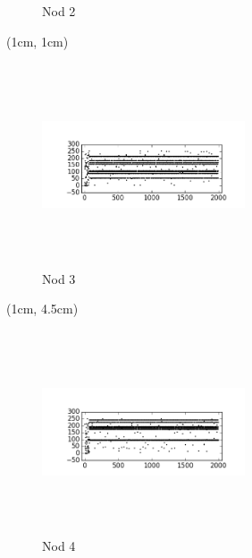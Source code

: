 \documentclass{beamer}
\theoremstyle{definition}
\begin{document}
\begin{frame}
{\begin{textblock*}{4cm}
\begin{figure}
            \caption{Nod 2}
        \end{figure}
        \end{textblock*}
    }
     {
        \begin{textblock*}{4cm}(1cm, 1cm)
        \begin{figure}
            \includegraphics[width=6cm,height=6cm,keepaspectratio]{img/results/carouri_db3.png}
            \caption{Nod 3}
        \end{figure}
        \end{textblock*}
    }
     {
        \begin{textblock*}{4cm}(1cm, 4.5cm)
        \begin{figure}
            \includegraphics[width=6cm,height=6cm,keepaspectratio]{img/results/carouri_db4.png}
            \caption{Nod 4} 
        \end{figure}
        \end{textblock*}
    }
\end{frame}
\end{document}
